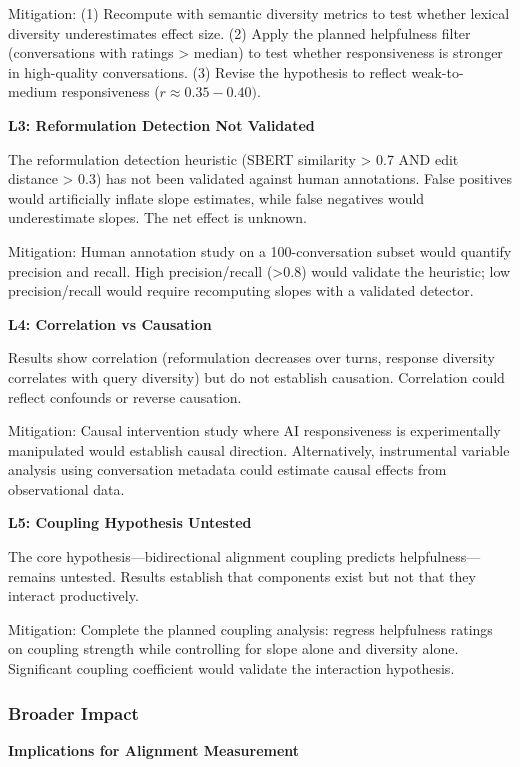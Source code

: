 Mitigation: (1) Recompute with semantic diversity metrics to test whether lexical diversity underestimates effect size. (2) Apply the planned helpfulness filter (conversations with ratings > median) to test whether responsiveness is stronger in high-quality conversations. (3) Revise the hypothesis to reflect weak-to-medium responsiveness ($r\approx 0.35-0.40)$.

\textbf{L3: Reformulation Detection Not Validated}

The reformulation detection heuristic (SBERT similarity > 0.7 AND edit distance > 0.3) has not been validated against human annotations. False positives would artificially inflate slope estimates, while false negatives would underestimate slopes. The net effect is unknown.

Mitigation: Human annotation study on a 100-conversation subset would quantify precision and recall. High precision/recall (>0.8) would validate the heuristic; low precision/recall would require recomputing slopes with a validated detector.

\textbf{L4: Correlation vs Causation}

Results show correlation (reformulation decreases over turns, response diversity correlates with query diversity) but do not establish causation. Correlation could reflect confounds or reverse causation.

Mitigation: Causal intervention study where AI responsiveness is experimentally manipulated would establish causal direction. Alternatively, instrumental variable analysis using conversation metadata could estimate causal effects from observational data.

\textbf{L5: Coupling Hypothesis Untested}

The core hypothesis---bidirectional alignment coupling predicts helpfulness---remains untested. Results establish that components exist but not that they interact productively.

Mitigation: Complete the planned coupling analysis: regress helpfulness ratings on coupling strength while controlling for slope alone and diversity alone. Significant coupling coefficient would validate the interaction hypothesis.

\subsubsection{Broader Impact}

\textbf{Implications for Alignment Measurement}

